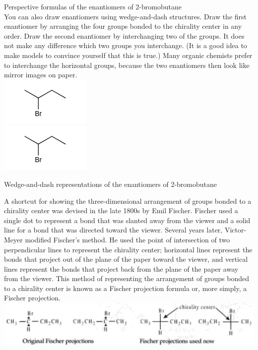 \documentclass[10pt]{article}
\begin{document}
Perspective formulas of the enantiomers of 2-bromobutane\\
You can also draw enantiomers using wedge-and-dash structures. Draw the first enantiomer by arranging the four groups bonded to the chirality center in any order. Draw the second enantiomer by interchanging two of the groups. It does not make any difference which two groups you interchange. (It is a good idea to make models to convince yourself that this is true.) Many organic chemists prefer to interchange the horizontal groups, because the two enantiomers then look like mirror images on paper.\\
\includegraphics{smile-19c79c93f2c6635773b05d204bf64c42bf878afc}\\
\includegraphics{smile-8b2c3b8278b8261904b65cb2dd42edb4c0657f6f}

Wedge-and-dash representations of the enantiomers of 2-bromobutane

A shortcut for showing the three-dimensional arrangement of groups bonded to a chirality center was devised in the late 1800s by Emil Fischer. Fischer used a single dot to represent a bond that was slanted away from the viewer and a solid line for a bond that was directed toward the viewer. Several years later, Victor-Meyer modified Fischer's method. He used the point of intersection of two perpendicular lines to represent the chirality center; horizontal lines represent the bonds that project out of the plane of the paper toward the viewer, and vertical lines represent the bonds that project back from the plane of the paper away from the viewer. This method of representing the arrangement of groups bonded to a chirality center is known as a Fischer projection formula or, more simply, a Fischer projection.\\
\includegraphics[max width=\textwidth, center]{2025_01_28_8470952b98110cec3aabg-052}
\end{document}
